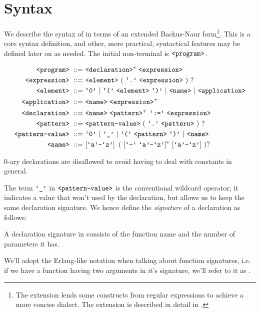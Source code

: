 \section{Syntax}\label{section:d-syntax}

We describe the syntax of \D{} in terms of an extended Backus-Naur
form\footnote{The extension lends some constructs from regular expressions to
achieve a more concise dialect. The extension is described in detail in
.}. This is a core syntax definition, and other, more
practical, syntactical features may be defined later on as needed. The initial
non-terminal is $\text{{\ttfamily<program>}}$.

\begin{align}
\nonterm{program}\ ::=&\ \nonterm{declaration}^*\ \nonterm{expression}\\
\nonterm{expression}\ ::=&\ \nonterm{element}\ (\ \term{.}\ \nonterm{expression}
\ )\ ?\\
\nonterm{element}\ ::=&\ \term{0}\ |\ \term{(}\ \nonterm{element}\ \term{)}\ |
\ \nonterm{name}\ |\ \nonterm{application}\\
\nonterm{application}\ ::=&\ \nonterm{name}
\ \nonterm{expression}^+\\
\nonterm{declaration}\ ::=&\ \nonterm{name}\ \nonterm{pattern}^+
\ \term{:=}\ \nonterm{expression}\\
\nonterm{pattern}\ ::=&\ \nonterm{pattern-value}\ (\ \term{.}
\ \nonterm{pattern}\ )\ ?\\
\nonterm{pattern-value}\ ::=&\ \term{0}\ |\ \term{\_}\ |\ \term{(}
\ \nonterm{pattern}\ \term{)}\ |\ \nonterm{name}\\
\nonterm{name}\ ::=&\ [\term{a}\mathmono{-}\term{z}]
\ \left (\ [\term{-}\ \term{a}\mathmono{-}\term{z}]^*
\ [\term{a}\mathmono{-}\term{z}]\ \right )?
\end{align}

0-ary declarations are disallowed to avoid having to deal with constants in
general.

The term $\text{{\ttfamily`\_'}}$ in $\text{{\ttfamily<pattern-value>}}$ is the conventional wildcard
operator; it indicates a value that won't used by the declaration, but allows
us to keep the same declaration signature. We hence define the \emph{signature}
of a declaration as follows:

\begin{definition}

A declaration signature in \D{} consists of the function name and the number of
parameters it has.

\end{definition}

We'll adopt the Erlang-like notation when talking about function signatures,
i.e. if we have a function  having two arguments in it's signature,
we'll refer to it as .


